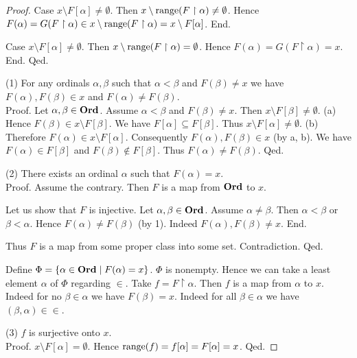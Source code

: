 \documentclass[../set-theory.tex]{subfiles}
\begin{document}
\begin{forthel}
\begin{proof}
        Case $x \setminus F[\alpha] \neq \emptyset$.
          Then $x \setminus \operatorname{range}(F \restriction \alpha) \neq \emptyset$.
          Hence $F(\alpha)
            = G(F \restriction \alpha)
            \in x \setminus \operatorname{range}(F \restriction \alpha)
            = x \setminus F[\alpha]$.
        End.

        Case $x \setminus F[\alpha] \neq \emptyset$.
          Then $x \setminus \operatorname{range}(F \restriction \alpha) = \emptyset$.
          Hence $F(\alpha)
            = G(F \restriction \alpha)
            = x$.
        End.
      Qed.

      (1) For any ordinals $\alpha, \beta$ such that $\alpha < \beta$ and
      $F(\beta) \neq x$ we have $F(\alpha), F(\beta) \in x$ and $F(\alpha) \neq
      F(\beta)$. \\
      Proof.
        Let $\alpha, \beta \in \mathbf{Ord}$.
        Assume $\alpha < \beta$ and $F(\beta) \neq x$.
        Then $x \setminus F[\beta] \neq \emptyset$.
        (a) Hence $F(\beta) \in x \setminus F[\beta]$.
        We have $F[\alpha] \subseteq F[\beta]$.
        Thus $x \setminus F[\alpha] \neq \emptyset$.
        (b) Therefore $F(\alpha) \in x \setminus F[\alpha]$.
        Consequently $F(\alpha), F(\beta) \in x$ (by a, b).
        We have $F(\alpha) \in F[\beta]$ and $F(\beta) \notin F[\beta]$.
        Thus $F(\alpha) \neq F(\beta)$.
      Qed.

      (2) There exists an ordinal $\alpha$ such that $F(\alpha) = x$. \\
      Proof.
        Assume the contrary.
        Then $F$ is a map from $\mathbf{Ord}$ to $x$.

        Let us show that $F$ is injective.
          Let $\alpha, \beta \in \mathbf{Ord}$.
          Assume $\alpha \neq \beta$.
          Then $\alpha < \beta$ or $\beta < \alpha$.
          Hence $F(\alpha) \neq F(\beta)$ (by 1).
          Indeed $F(\alpha), F(\beta) \neq x$.
        End.

        Thus $F$ is a map from some proper class into some set.
        Contradiction.
      Qed.

      Define $\Phi = \{ \alpha \in \mathbf{Ord} \mid F(\alpha) = x \}$.
      $\Phi$ is nonempty.
      Hence we can take a least element $\alpha$ of $\Phi$ regarding ${\in}$.
      Take $f = F \restriction \alpha$.
      Then $f$ is a map from $\alpha$ to $x$.
      Indeed for no $\beta \in \alpha$ we have $F(\beta) = x$.
      Indeed for all $\beta \in \alpha$ we have $(\beta, \alpha) \in {\in}$.

      (3) $f$ is surjective onto $x$. \\
      Proof.
        $x \setminus F[\alpha] = \emptyset$.
        Hence $\operatorname{range}(f)
          = f[\alpha]
          = F[\alpha]
          = x$.
      Qed.


\end{proof}
\end{forthel}
\end{document}
